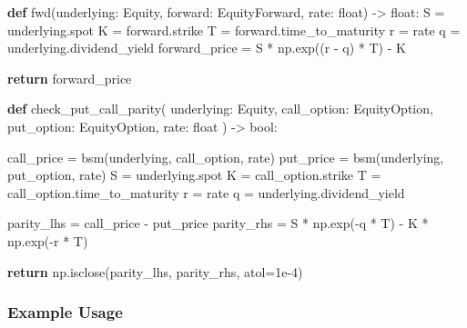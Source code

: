 \documentclass[
  letterpaper,
  DIV=11,
  numbers=noendperiod]{scrartcl}
\newenvironment{Shaded}{\begin{snugshade}}{\end{snugshade}}
\newcommand{\BuiltInTok}[1]{\textcolor[rgb]{0.00,0.23,0.31}{#1}}
\newcommand{\ControlFlowTok}[1]{\textcolor[rgb]{0.00,0.23,0.31}{\textbf{#1}}}
\newcommand{\FloatTok}[1]{\textcolor[rgb]{0.68,0.00,0.00}{#1}}
\newcommand{\KeywordTok}[1]{\textcolor[rgb]{0.00,0.23,0.31}{\textbf{#1}}}
\newcommand{\NormalTok}[1]{\textcolor[rgb]{0.00,0.23,0.31}{#1}}
\newcommand{\OperatorTok}[1]{\textcolor[rgb]{0.37,0.37,0.37}{#1}}
\begin{document}
\begin{Shaded}
\begin{Highlighting}[]
\KeywordTok{def}\NormalTok{ fwd(underlying: Equity, forward: EquityForward, rate: }\BuiltInTok{float}\NormalTok{) }\OperatorTok{{-}\textgreater{}} \BuiltInTok{float}\NormalTok{:}
\NormalTok{    S }\OperatorTok{=}\NormalTok{ underlying.spot}
\NormalTok{    K }\OperatorTok{=}\NormalTok{ forward.strike}
\NormalTok{    T }\OperatorTok{=}\NormalTok{ forward.time\_to\_maturity}
\NormalTok{    r }\OperatorTok{=}\NormalTok{ rate}
\NormalTok{    q }\OperatorTok{=}\NormalTok{ underlying.dividend\_yield}
\NormalTok{    forward\_price }\OperatorTok{=}\NormalTok{ S }\OperatorTok{*}\NormalTok{ np.exp((r }\OperatorTok{{-}}\NormalTok{ q) }\OperatorTok{*}\NormalTok{ T) }\OperatorTok{{-}}\NormalTok{ K}

    \ControlFlowTok{return}\NormalTok{ forward\_price}

\KeywordTok{def}\NormalTok{ check\_put\_call\_parity(}
\NormalTok{    underlying: Equity, }
\NormalTok{    call\_option: EquityOption, }
\NormalTok{    put\_option: EquityOption, }
\NormalTok{    rate: }\BuiltInTok{float}
\NormalTok{    ) }\OperatorTok{{-}\textgreater{}} \BuiltInTok{bool}\NormalTok{:}

\NormalTok{    call\_price }\OperatorTok{=}\NormalTok{ bsm(underlying, call\_option, rate)}
\NormalTok{    put\_price }\OperatorTok{=}\NormalTok{ bsm(underlying, put\_option, rate)}
\NormalTok{    S }\OperatorTok{=}\NormalTok{ underlying.spot}
\NormalTok{    K }\OperatorTok{=}\NormalTok{ call\_option.strike}
\NormalTok{    T }\OperatorTok{=}\NormalTok{ call\_option.time\_to\_maturity}
\NormalTok{    r }\OperatorTok{=}\NormalTok{ rate}
\NormalTok{    q }\OperatorTok{=}\NormalTok{ underlying.dividend\_yield}

\NormalTok{    parity\_lhs }\OperatorTok{=}\NormalTok{ call\_price }\OperatorTok{{-}}\NormalTok{ put\_price}
\NormalTok{    parity\_rhs }\OperatorTok{=}\NormalTok{ S }\OperatorTok{*}\NormalTok{ np.exp(}\OperatorTok{{-}}\NormalTok{q }\OperatorTok{*}\NormalTok{ T) }\OperatorTok{{-}}\NormalTok{ K }\OperatorTok{*}\NormalTok{ np.exp(}\OperatorTok{{-}}\NormalTok{r }\OperatorTok{*}\NormalTok{ T)}

    \ControlFlowTok{return}\NormalTok{ np.isclose(parity\_lhs, parity\_rhs, atol}\OperatorTok{=}\FloatTok{1e{-}4}\NormalTok{)}
\end{Highlighting}
\end{Shaded}

\subsubsection{Example Usage}\label{example-usage}
\end{document}
